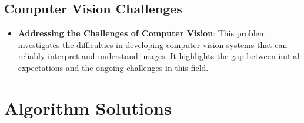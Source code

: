\documentclass{article}%
\begin{document}
%
\subsection{Computer Vision Challenges}%
\label{subsec:ComputerVisionChallenges}%
\begin{itemize}[leftmargin=*]%
\item \href{https://purdue.brightspace.com/d2l/common/assets/pdfjs-d2l-dist/1.0.14-legacy/web/viewer.html?file=\%2Fcontent\%2Fenforced\%2F1095467-wl.202510.CS.24300.001\%2F02L2-Intro.pdf\%3Fou\%3D1095467\&lang=en-us\&container=d2l-fileviewer-rendered-pdf\&fullscreen=d2l-fileviewer-rendered-pdf-dialog\&height=667#page=15}{\textbf{Addressing the Challenges of Computer Vision}}: This problem investigates the difficulties in developing computer vision systems that can reliably interpret and understand images. It highlights the gap between initial expectations and the ongoing challenges in this field.%
\end{itemize}

%
\section{Algorithm Solutions}%
\label{sec:AlgorithmSolutions}%
\end{document}
